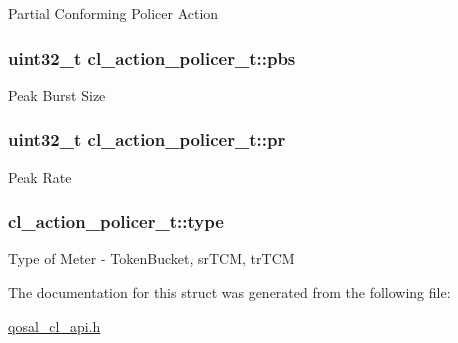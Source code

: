 Partial Conforming Policer Action \hypertarget{structcl__action__policer__t_a36a8d678c02da25d3add2aa1036d11d5}{
\subsubsection[{pbs}]{\setlength{\rightskip}{0pt plus 5cm}uint32\-\_\-t cl\-\_\-action\-\_\-policer\-\_\-t\-::pbs}}\label{structcl__action__policer__t_a36a8d678c02da25d3add2aa1036d11d5}
Peak Burst Size \hypertarget{structcl__action__policer__t_a8d5e61660df2335c7dbed64b6aa90d9c}{
\subsubsection[{pr}]{\setlength{\rightskip}{0pt plus 5cm}uint32\-\_\-t cl\-\_\-action\-\_\-policer\-\_\-t\-::pr}}\label{structcl__action__policer__t_a8d5e61660df2335c7dbed64b6aa90d9c}
Peak Rate \hypertarget{structcl__action__policer__t_ab081660ba160894ca6fe330fb23c115f}{
\subsubsection[{type}]{ cl\-\_\-action\-\_\-policer\-\_\-t\-::type}}\label{structcl__action__policer__t_ab081660ba160894ca6fe330fb23c115f}
Type of Meter -\/ Token\-Bucket, sr\-T\-C\-M, tr\-T\-C\-M 

The documentation for this struct was generated from the following file\-:\begin{DoxyCompactItemize}
\item 
\hyperlink{qosal__cl__api_8h}{qosal\-\_\-cl\-\_\-api.\-h}\end{DoxyCompactItemize}
